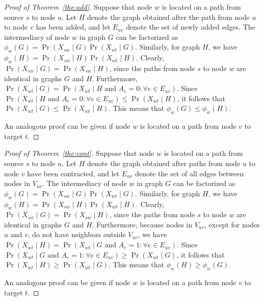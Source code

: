 \documentclass[9pt,twocolumn,twoside,lineno]{pnas-alt}
\theoremstyle{definition}
\newcommand{\theref}[1]{Theorem~\ref{the:#1}\xspace}
\begin{document}
{\begin{proof}[Proof of \theref{add}]
    Suppose that node $w$ is located on a path from source $s$ to node $u$. Let $H$ denote the graph obtained after the path from node $u$ to node $v$ has been added, and let $E_{uv}$ denote the set of newly added edges. The intermediacy of node $w$ in graph $G$ can be factorized as $\phi_w(G) = \Pr(X_{sw} \mid G)\Pr(X_{wt} \mid G)$. Similarly, for graph $H$, we have $\phi_w(H) = \Pr(X_{sw} \mid H)\Pr(X_{wt} \mid H)$. Clearly, $\Pr(X_{sw} \mid G) = \Pr(X_{sw} \mid H)$, since the paths from node $s$ to node $w$ are identical in graphs $G$ and $H$. Furthermore, $\Pr(X_{wt} \mid G) = \Pr(X_{wt} \mid H \text{~and~} A_e = 0\!:\!\forall e \in E_{uv})$. Since $\Pr(X_{wt} \mid H \text{~and~} A_e = 0\!:\!\forall e \in E_{uv}) \leq \Pr(X_{wt} \mid H)$, it follows that $\Pr(X_{wt} \mid G) \leq \Pr(X_{wt} \mid H)$. This means that $\phi_w(G) \leq \phi_w(H)$.

    An analogous proof can be given if node $w$ is located on a path from node $v$ to target $t$.
\end{proof}

\begin{proof}[Proof of \theref{cont}]
    Suppose that node $w$ is located on a path from source $s$ to node $u$. Let $H$ denote the graph obtained after paths from node $u$ to node $v$ have been contracted, and let $E_{uv}$ denote the set of all edges between nodes in $V_{uv}$. The intermediacy of node $w$ in graph $G$ can be factorized as $\phi_w(G) = \Pr(X_{sw} \mid G)\Pr(X_{wt} \mid G)$. Similarly, for graph $H$, we have $\phi_w(H) = \Pr(X_{sw} \mid H)\Pr(X_{wt} \mid H)$. Clearly, $\Pr(X_{sw} \mid G) = \Pr(X_{sw} \mid H)$, since the paths from node $s$ to node $w$ are identical in graphs $G$ and $H$. Furthermore, because nodes in $V_{uv}$, except for nodes $u$ and $v$, do not have neighbors outside $V_{uv}$, we have $\Pr(X_{wt} \mid H) = \Pr(X_{wt} \mid G \text{~and~} A_e = 1\!:\!\forall e \in E_{uv})$. Since $\Pr(X_{wt} \mid G \text{~and~} A_e = 1\!:\!\forall e \in E_{uv}) \geq \Pr(X_{wt} \mid G)$, it follows that $\Pr(X_{wt} \mid H) \geq \Pr(X_{wt} \mid G)$. This means that $\phi_w(H) \geq \phi_w(G)$.

    An analogous proof can be given if node $w$ is located on a path from node $v$ to target $t$.
\end{proof}

%
%

}
\end{document}
